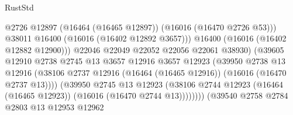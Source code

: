 \begin{lexlean}{RustStd}
\begin{coremodule}
                                                @2726
                                                @12897
                                                (@16464 (@16465 @12897))
                                                (@16016 (@16470 @2726 @53)))
                                              @38011
                                              @16400
                                              (@16016 (@16402 @12892 @3657)))
                                            @16400
                                            (@16016 (@16402 @12882 @12900)))
                                          @22046
                                          @22049
                                          @22052
                                          @22056
                                          @22061
                                          @38930)
                                        (@39605
                                          @12910
                                          @2738
                                          @2745
                                          @13
                                          @3657
                                          @12916
                                          @3657
                                          @12923
                                          (@39950
                                            @2738
                                            @13
                                            @12916
                                            (@38106
                                              @2737
                                              @12916
                                              (@16464 (@16465 @12916))
                                              (@16016 (@16470 @2737 @13))))
                                          (@39950
                                            @2745
                                            @13
                                            @12923
                                            (@38106
                                              @2744
                                              @12923
                                              (@16464 (@16465 @12923))
                                              (@16016 (@16470 @2744 @13))))))))
                                  (@39540
                                    @2758
                                    @2784
                                    @2803
                                    @13
                                    @12953
                                    @12962

\end{coremodule}
\end{lexlean}
